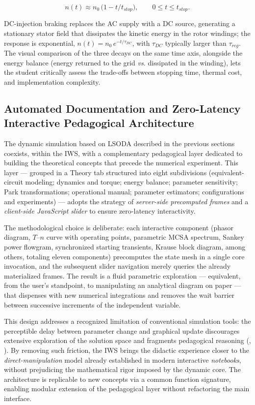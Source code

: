 \documentclass[a4paper]{ifacconf}
\begin{document}
\begin{equation}
\label{eq:plugging_en}
n(t) \approx n_0\,\bigl(1 - t/t_{stop}\bigr), \qquad 0 \leq t \leq t_{stop}.
\end{equation}

DC-injection braking replaces the AC supply with a DC source, generating a stationary stator field that dissipates the kinetic energy in the rotor windings; the response is exponential, $n(t) = n_0\,e^{-t/\tau_{DC}}$, with $\tau_{DC}$ typically larger than $\tau_{reg}$. The visual comparison of the three decays on the same time axis, alongside the energy balance (energy returned to the grid \textit{vs.} dissipated in the winding), lets the student critically assess the trade-offs between stopping time, thermal cost, and implementation complexity.

\subsection{Automated Documentation and Zero-Latency Interactive Pedagogical Architecture}
\label{subsec:pedagogical_en}

The dynamic simulation based on LSODA described in the previous sections coexists, within the IWS, with a complementary pedagogical layer dedicated to building the theoretical concepts that precede the numerical experiment. This layer --- grouped in a Theory tab structured into eight subdivisions (equivalent-circuit modeling; dynamics and torque; energy balance; parameter sensitivity; Park transformations; operational manual; parameter estimators; configurations and experiments) --- adopts the strategy of \textit{server-side precomputed frames} and a \textit{client-side JavaScript slider} to ensure zero-latency interactivity.

The methodological choice is deliberate: each interactive component (phasor diagram, $T$--$n$ curve with operating points, parametric MCSA spectrum, Sankey power flowgram, synchronized starting transients, Krause block diagram, among others, totaling eleven components) precomputes the state mesh in a single core invocation, and the subsequent slider navigation merely queries the already materialized frames. The result is a fluid parametric exploration --- equivalent, from the user's standpoint, to manipulating an analytical diagram on paper --- that dispenses with new numerical integrations and removes the wait barrier between successive increments of the independent variable.

This design addresses a recognized limitation of conventional simulation tools: the perceptible delay between parameter change and graphical update discourages extensive exploration of the solution space and fragments pedagogical reasoning (\citeauthor{leedy2013simulink}, \citeyear{leedy2013simulink}). By removing such friction, the IWS brings the didactic experience closer to the \textit{direct-manipulation} model already established in modern interactive \textit{notebooks}, without prejudicing the mathematical rigor imposed by the dynamic core. The architecture is replicable to new concepts via a common function signature, enabling modular extension of the pedagogical layer without refactoring the main interface.
\end{document}
